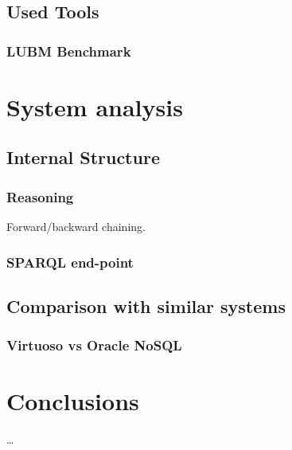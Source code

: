 \section{Used Tools}
\subsection{LUBM Benchmark}

\chapter{System analysis}
\section{Internal Structure}
\subsection{Reasoning}
Forward/backward chaining.

\subsection{SPARQL end-point}

\section{Comparison with similar systems}
\subsection{Virtuoso vs Oracle NoSQL}

\chapter{Conclusions}
\ldots